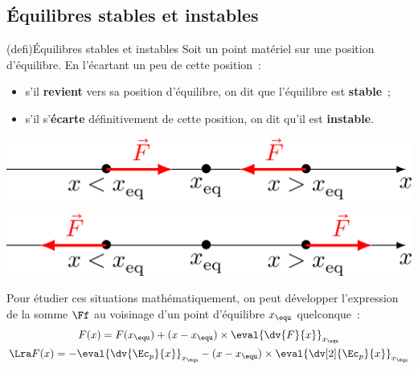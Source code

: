 \documentclass[../../main/main.tex]{subfiles}
\begin{document}
\subsection{Équilibres stables et instables}

\begin{tcb*}(defi){Équilibres stables et instables}
	Soit un point matériel sur une position d'équilibre. En l'écartant un peu de
	cette position~:
	\begin{itemize}
		\item s'il \textbf{revient} vers sa position d'équilibre, on dit que
		      l'équilibre est \textbf{stable}~;
		\item s'il s'\textbf{écarte} définitivement de cette position, on dit
		      qu'il est \textbf{instable}.
	\end{itemize}
	\begin{minipage}{0.45\linewidth}
		\begin{center}
			\includegraphics[width=\linewidth]{stab_a-xeq}
		\end{center}
	\end{minipage}
	\hfill
	\begin{minipage}{0.45\linewidth}
		\begin{center}
			\includegraphics[width=\linewidth]{instab_a-xeq}
		\end{center}
	\end{minipage}
\end{tcb*}

Pour étudier ces situations mathématiquement, on peut développer l'expression de
la somme $\Ff$ au voisinage d'un point d'équilibre $x_{\equ}$ quelconque~:
\begin{gather*}
	F(x) = F(x_{\equ}) + (x-x_{\equ})\times \eval{\dv{F}{x}}_{x_{\equ}}
	\\\Lra
	F(x) = - \eval{\dv{\Ec_p}{x}}_{x_{\equ}} -
	(x-x_{\equ})\times\eval{\dv[2]{\Ec_p}{x}}_{x_{\equ}}
\end{gather*}
\end{document}

